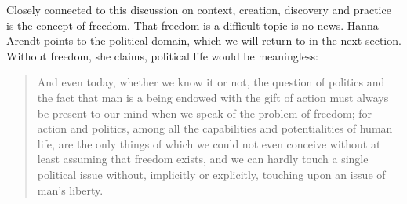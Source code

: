 \documentclass[a4paper]{article}
\begin{document}
Closely connected to this discussion on context, creation, discovery and practice is the concept of freedom. That freedom is a difficult topic is no news. Hanna Arendt points to the political domain, which we will return to in the next section. Without freedom, she claims, political life would be meaningless:

\begin{quote}
And even today, whether we know it or not, the question of politics and the fact that man is a being endowed with the gift of action must always be present to our mind when we speak of the problem of freedom; for action and politics, among all the capabilities and potentialities of human life, are the only things of which we could not even conceive without at least assuming that freedom exists, and we can hardly touch a single political issue without, implicitly or explicitly, touching upon an issue of man's liberty.  
\citep{arendt77}
\end{quote}
\end{document}
